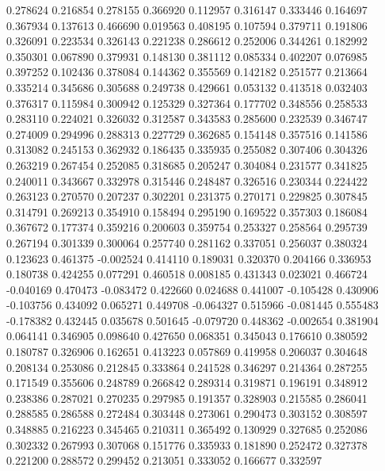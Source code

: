 0.278624
0.216854
0.278155
0.366920
0.112957
0.316147
0.333446
0.164697
0.367934
0.137613
0.466690
0.019563
0.408195
0.107594
0.379711
0.191806
0.326091
0.223534
0.326143
0.221238
0.286612
0.252006
0.344261
0.182992
0.350301
0.067890
0.379931
0.148130
0.381112
0.085334
0.402207
0.076985
0.397252
0.102436
0.378084
0.144362
0.355569
0.142182
0.251577
0.213664
0.335214
0.345686
0.305688
0.249738
0.429661
0.053132
0.413518
0.032403
0.376317
0.115984
0.300942
0.125329
0.327364
0.177702
0.348556
0.258533
0.283110
0.224021
0.326032
0.312587
0.343583
0.285600
0.232539
0.346747
0.274009
0.294996
0.288313
0.227729
0.362685
0.154148
0.357516
0.141586
0.313082
0.245153
0.362932
0.186435
0.335935
0.255082
0.307406
0.304326
0.263219
0.267454
0.252085
0.318685
0.205247
0.304084
0.231577
0.341825
0.240011
0.343667
0.332978
0.315446
0.248487
0.326516
0.230344
0.224422
0.263123
0.270570
0.207237
0.302201
0.231375
0.270171
0.229825
0.307845
0.314791
0.269213
0.354910
0.158494
0.295190
0.169522
0.357303
0.186084
0.367672
0.177374
0.359216
0.200603
0.359754
0.253327
0.258564
0.295739
0.267194
0.301339
0.300064
0.257740
0.281162
0.337051
0.256037
0.380324
0.123623
0.461375
-0.002524
0.414110
0.189031
0.320370
0.204166
0.336953
0.180738
0.424255
0.077291
0.460518
0.008185
0.431343
0.023021
0.466724
-0.040169
0.470473
-0.083472
0.422660
0.024688
0.441007
-0.105428
0.430906
-0.103756
0.434092
0.065271
0.449708
-0.064327
0.515966
-0.081445
0.555483
-0.178382
0.432445
0.035678
0.501645
-0.079720
0.448362
-0.002654
0.381904
0.064141
0.346905
0.098640
0.427650
0.068351
0.345043
0.176610
0.380592
0.180787
0.326906
0.162651
0.413223
0.057869
0.419958
0.206037
0.304648
0.208134
0.253086
0.212845
0.333864
0.241528
0.346297
0.214364
0.287255
0.171549
0.355606
0.248789
0.266842
0.289314
0.319871
0.196191
0.348912
0.238386
0.287021
0.270235
0.297985
0.191357
0.328903
0.215585
0.286041
0.288585
0.286588
0.272484
0.303448
0.273061
0.290473
0.303152
0.308597
0.348885
0.216223
0.345465
0.210311
0.365492
0.130929
0.327685
0.252086
0.302332
0.267993
0.307068
0.151776
0.335933
0.181890
0.252472
0.327378
0.221200
0.288572
0.299452
0.213051
0.333052
0.166677
0.332597
